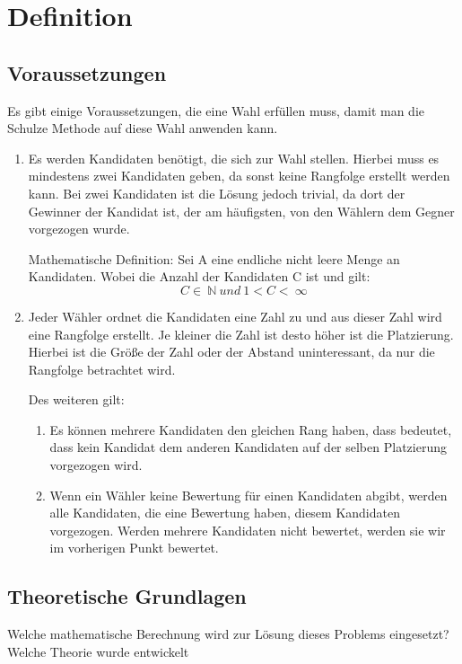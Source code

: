 \section{Definition}
\label{sec:definition}


\subsection{Voraussetzungen} 
\label{sec:voraussetzungen}
Es gibt einige Voraussetzungen, die eine Wahl erfüllen muss, damit man die Schulze Methode auf diese Wahl anwenden kann.

\begin{enumerate}
\item Es werden Kandidaten benötigt, die sich zur Wahl stellen. Hierbei muss es mindestens zwei Kandidaten geben, da sonst keine Rangfolge erstellt werden kann. Bei zwei Kandidaten ist die Lösung jedoch trivial, da dort der Gewinner der Kandidat ist, der am häufigsten, von den Wählern dem Gegner vorgezogen wurde.

Mathematische Definition:
Sei A eine endliche nicht leere Menge an Kandidaten. Wobei die Anzahl der Kandidaten C ist und gilt: 
\[
  C \in\ \mathbb{N}\  und \ 1 < C <\ \infty
\]

\item Jeder Wähler ordnet die Kandidaten eine Zahl zu und aus dieser Zahl wird eine Rangfolge erstellt. Je kleiner die Zahl ist desto höher ist die Platzierung. Hierbei ist die Größe der Zahl oder der Abstand uninteressant, da nur die Rangfolge betrachtet wird.

Des weiteren gilt:
\begin{enumerate}
\item \label{itm:Regel1} Es können mehrere Kandidaten den gleichen Rang haben, dass bedeutet, dass kein Kandidat dem anderen Kandidaten auf der selben Platzierung vorgezogen wird. 
\item Wenn ein Wähler keine Bewertung für einen Kandidaten abgibt, werden alle Kandidaten, die eine Bewertung haben, diesem Kandidaten vorgezogen. Werden mehrere Kandidaten nicht bewertet, werden sie wir im vorherigen Punkt bewertet.
\end{enumerate}



\end{enumerate}


\subsection{Theoretische Grundlagen} 
\label{sec:theoretische Grundlagen}
Welche mathematische Berechnung wird zur Lösung dieses Problems eingesetzt? Welche Theorie wurde entwickelt



